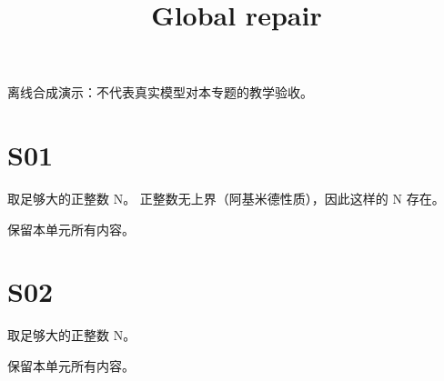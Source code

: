 \documentclass[UTF8,fontset=fandol,11pt]{ctexart}
\title{Global repair}
\date{}
\begin{document}
\maketitle
\par\noindent 离线合成演示：不代表真实模型对本专题的教学验收。\par
\section{S01}\label{sec:S01}
取足够大的正整数 N。 正整数无上界（阿基米德性质），因此这样的 N 存在。\par
保留本单元所有内容。\par
\section{S02}\label{sec:S02}
取足够大的正整数 N。\par
保留本单元所有内容。\par
\end{document}
